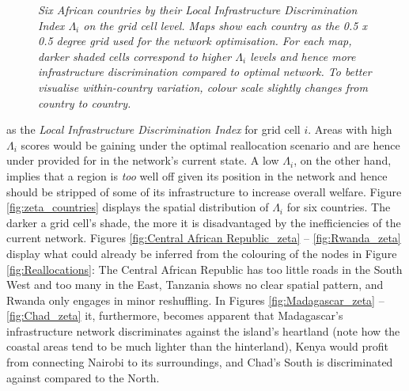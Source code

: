 \documentclass[11pt, oneside]{article}   	%
\begin{document}
\begin{figure}
\label{fig:zeta_countries}
\justify
\begin{spacing}{0.7}
\textit{\footnotesize Six African countries by their Local Infrastructure Discrimination Index $\Lambda_{i}$ on the grid cell level. Maps show each country as the 0.5 x 0.5 degree grid used for the network optimisation. For each map, darker shaded cells correspond to higher $\Lambda_{i}$ levels and hence more infrastructure discrimination compared to optimal network. To better visualise within-country variation, colour scale slightly changes from country to country.}
\end{spacing}
\end{figure}

as the \emph{Local Infrastructure Discrimination Index} for grid cell $i$. Areas with high $\Lambda_{i}$ scores would be gaining under the optimal reallocation scenario and are hence under provided for in the network's current state. A low $\Lambda_{i}$, on the other hand, implies that a region is \emph{too} well off given its position in the network and hence should be stripped of some of its infrastructure to increase overall welfare. Figure \eqref{fig:zeta_countries} displays the spatial distribution of $\Lambda_{i}$ for six countries. The darker a grid cell's shade, the more it is disadvantaged by the inefficiencies of the current network. Figures \eqref{fig:Central African Republic_zeta} -- \eqref{fig:Rwanda_zeta} display what could already be inferred from the colouring of the nodes in Figure \eqref{fig:Reallocations}: The Central African Republic has too little roads in the South West and too many in the East, Tanzania shows no clear spatial pattern, and Rwanda only engages in minor reshuffling. In Figures \eqref{fig:Madagascar_zeta} -- \eqref{fig:Chad_zeta} it, furthermore, becomes apparent that Madagascar's infrastructure network discriminates against the island's heartland (note how the coastal areas tend to be much lighter than the hinterland), Kenya would profit from connecting Nairobi to its surroundings, and Chad's South is discriminated against compared to the North.
\end{document}
